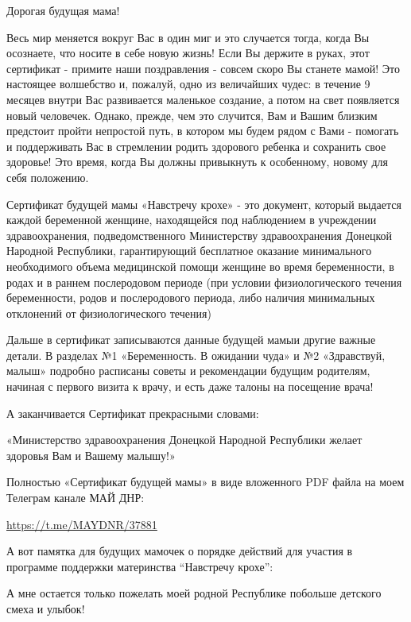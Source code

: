 \begin{zzquote}
	
Дорогая будущая мама!

Весь мир меняется вокруг Вас в один миг и это случается тогда, когда Вы
осознаете, что носите в себе новую жизнь! Если Вы держите в руках, этот
сертификат - примите наши поздравления - совсем скоро Вы станете мамой! Это
настоящее волшебство и, пожалуй, одно из величайших чудес: в течение 9 месяцев
внутри Вас развивается маленькое создание, а потом на свет появляется новый
человечек. Однако, прежде, чем это случится, Вам и Вашим близким предстоит
пройти непростой путь, в котором мы будем рядом с Вами - помогать и
поддерживать Вас в стремлении родить здорового ребенка и сохранить свое
здоровье! Это время, когда Вы должны привыкнуть к особенному, новому для себя
положению.

Сертификат будущей мамы «Навстречу крохе» - это документ, который выдается
каждой беременной женщине, находящейся под наблюдением в учреждении
здравоохранения, подведомственного Министерству здравоохранения Донецкой
Народной Республики, гарантирующий бесплатное оказание минимального
необходимого объема медицинской помощи женщине во время беременности, в родах и
в раннем послеродовом периоде (при условии физиологического течения
беременности, родов и послеродового периода, либо наличия минимальных
отклонений от физиологического течения)

Дальше в сертификат записываются данные будущей мамыи другие важные детали. В
разделах №1 «Беременность. В ожидании чуда» и №2 «Здравствуй, малыш» подробно
расписаны советы и рекомендации будущим родителям, начиная с первого визита к
врачу, и есть даже талоны на посещение врача!

\end{zzquote}

А заканчивается Сертификат прекрасными словами:

«Министерство здравоохранения Донецкой Народной Республики желает здоровья Вам
и Вашему малышу!»

Полностью «Сертификат будущей мамы» в виде вложенного PDF файла на моем
Телеграм канале МАЙ ДНР:

\url{https://t.me/MAYDNR/37881}

А вот памятка для будущих мамочек о порядке действий для участия в программе
поддержки материнства \enquote{Навстречу крохе}:


А мне остается только пожелать моей родной Республике побольше детского смеха и
улыбок!
